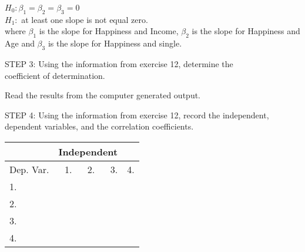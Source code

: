 \documentclass[11pt]{book}\usepackage[]{graphicx}\usepackage[]{color}
\begin{document}
\begin{exercises}
\begin{solution}
       $H_0: \beta_1 = \beta_2 = \beta_3 = 0$ \\
       $H_1:$ at least one slope is not equal zero. \\
       where $\beta_1$ is the slope for Happiness and Income,  $\beta_2$ is the slope for Happiness and Age and $\beta_3$ is         the slope for Happiness and single.

    \end{solution}


  \begin{exercise} %

    STEP 3: Using the information from exercise 12, determine the \\ coefficient of determination.

    \vspace{5mm}

    \end{exercise}
    \begin{solution}      %

       Read the results from the computer generated output.

    \end{solution}

  \begin{exercise} %

    STEP 4: Using the information from exercise 12, record the independent, dependent variables, and the correlation coefficients.

     \begin{table}[ht]
     \centering
     {\tiny{
     \begin{tabular}{lrrrr} \hline
         &  \multicolumn{3}{c}{Independent} \\ \hline

     Dep. Var. & 1. \underline{\phantom{xxxx}} &
                 2. \underline{\phantom{xxxx}} &
                 3. \underline{\phantom{xxxx}} &
                 4. \underline{\phantom{xxxx}} \\ \hline
     1. \underline{\phantom{xxxx}}  &
     \underline{\phantom{xxxx}}  \\ \hline
     2. \underline{\phantom{xxxx}}  &
     \underline{\phantom{xxxx}} &
     \underline{\phantom{xxxx}}  \\ \hline
     3. \underline{\phantom{xxxx}}  &
     \underline{\phantom{xxxx}} &
     \underline{\phantom{xxxx}} &
     \underline{\phantom{xxxx}}  \\ \hline
     4. \underline{\phantom{xxxx}}  &
     \underline{\phantom{xxxx}} &
     \underline{\phantom{xxxx}} &
     \underline{\phantom{xxxx}} &
     \underline{\phantom{xxxx}}  \\ \hline
     \end{tabular}
     }}
     \end{table}


\end{exercise}
\end{exercises}
\end{document}
